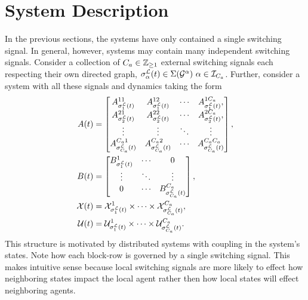 
\section{System Description}
In the previous sections, the systems have only contained a single switching signal. In general, however, systems may contain many independent switching signals. Consider a collection of ${C_a}\in\mathbb{Z}_{\geq 1}$ external switching signals each respecting their own directed graph, $\ssl[\agentidx](t)\in\Sigma(\graph^\agentidx)\ \agentidx\in\idxset{\numagents}$. Further, consider a system with all these signals and dynamics taking the form
\begin{align}
A(t)&=\begin{bmatrix}
A^{11}_{\ssl[1](t)}&A^{12}_{\ssl[1](t)}&\cdots&A^{1\numagents}_{\ssl[1](t)},\\
A^{21}_{\ssl[2](t)}&A^{22}_{\ssl[2](t)}&\cdots&A^{2\numagents}_{\ssl[2](t)},\\
\vdots&\vdots & \ddots & \vdots\\
A^{\numagents 1}_{\ssl[\numagents](t)} & A^{\numagents 2}_{\ssl[\numagents](t)} &\cdots & A^{\numagents \numagents}_{\ssl[\numagents](t)} 
\end{bmatrix},\\
B(t)&=\begin{bmatrix}
B^{1}_{\ssl[1](t)} & \cdots & 0\\
\vdots             & \ddots & \vdots\\
0                  & \cdots & B^{\numagents}_{\ssl[\numagents](t)}
\end{bmatrix},\\
\xcon(t)&=\xcon[\ssl[1](t)]^1\times\cdots\times\xcon[\ssl[\numagents](t)]^\numagents,\\
\ucon(t)&=\ucon[\ssl[1](t)]^1\times\cdots\times\ucon[\ssl[\numagents](t)]^\numagents.
\end{align}
This structure is motivated by distributed systems with coupling in the system's states. Note how each block-row is governed by a single switching signal. This makes intuitive sense because local switching signals are more likely to effect how neighboring states impact the local agent rather then how local states will effect neighboring agents.

